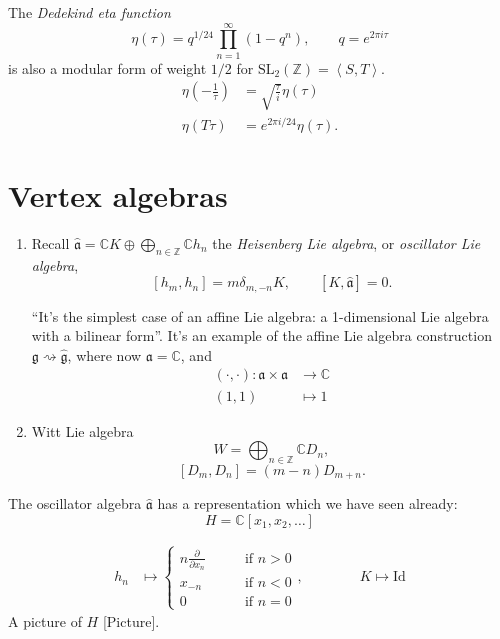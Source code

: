 \begin{theorem}
\label{theorem-Dedekind-eta-function}
The {\it Dedekind eta function} 
$$
\eta(\tau)=q^{1/24}\prod_{n=1}^\infty (1-q^n),\qquad q=e^{2\pi i \tau}
$$
is also a modular form of weight $1/2$ for
$\text{SL}_2(\mathbb{Z})=\left<S,T\right>$.
\begin{align*}
\eta\left(-\frac{1}{\tau}\right)&=\sqrt{\frac{\tau}{i}}\eta(\tau)\\
\eta(T\tau)&=e^{2\pi i/24}\eta(\tau).
\end{align*}

\end{theorem}

\section{Vertex algebras}
\label{section-vertex-algebras}

\begin{enumerate}
\item Recall $\hat{\mathfrak{a}}=\mathbb{C}K\oplus 
\bigoplus_{n \in \mathbb{Z}}\mathbb{C}h_n$ the {\it Heisenberg Lie algebra},
or {\it oscillator Lie algebra},
$$
[h_m,h_n]=m\delta_{m,-n}K,\qquad [K,\hat{\mathfrak{a}}]=0.
$$
\begin{remark}
\label{remark-Heisenberg-is-affine}
``It's the simplest case of an affine Lie algebra: a 1-dimensional
Lie algebra with a bilinear form''. It's an example of the affine
Lie algebra construction
$\mathfrak{g} \rightsquigarrow \hat{\mathfrak{g}}$,
where now $\mathfrak{a}=\mathbb{C}$,
and
 \begin{align*}
(\cdot,\cdot): \mathfrak{a}\times\mathfrak{a} &\longrightarrow \mathbb{C} \\
(1,1) &\longmapsto 1
\end{align*}
\end{remark}

\item Witt Lie algebra
$$
W=\bigoplus_{n \in \mathbb{Z}}\mathbb{C}D_n,
$$
$$
[D_m,D_n]=(m-n)D_{m+n}.
$$
\end{enumerate}

\medskip\noindent
The oscillator algebra $\hat{\mathfrak{a}}$ 
has a representation which we have seen already:
$$
H=\mathbb{C}[x_1,x_2,\ldots]
$$

\begin{align*}
h_n&\mapsto \begin{cases}
n \frac{\partial }{\partial x_n}\qquad &\text{if }n>0\\
x_{-n}\qquad &\text{if }n<0\\
0\qquad &\text{if }n=0
\end{cases},
\qquad \qquad  K\mapsto \text{Id}
\end{align*}
A picture of $H$ [Picture].

